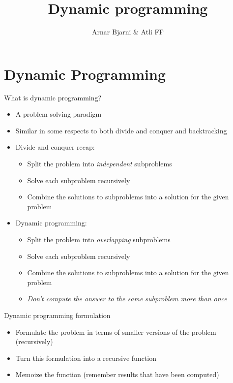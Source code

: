 \documentclass{beamer}
\title{Dynamic programming}
\author{Arnar Bjarni \& Atli FF}
\institute{\href{http://ru.is/td}{School of Computer Science} \\[2pt] \href{http://ru.is}{Reykjavík University}}
\begin{document}
\maketitle

\section*{Dynamic Programming}

\begin{frame}[plain]{What is dynamic programming?}
    \begin{itemize}
        \item A problem solving paradigm
        \item Similar in some respects to both divide and conquer and backtracking
        \vspace{5pt}
        \item Divide and conquer recap:
        \begin{itemize}
            \item Split the problem into \textit{independent} subproblems
            \item Solve each subproblem recursively
            \item Combine the solutions to subproblems into a solution for the given problem
        \end{itemize}
        \vspace{5pt}
        \item Dynamic programming:
        \begin{itemize}
            \item Split the problem into \textit{overlapping} subproblems
            \item Solve each subproblem recursively
            \item Combine the solutions to subproblems into a solution for the given problem
            \item \textit{Don't compute the answer to the same subproblem more than once}
        \end{itemize}
    \end{itemize}
\end{frame}

\begin{frame}{Dynamic programming formulation}
    \vspace{30pt}
    \begin{itemize}
        \item Formulate the problem in terms of smaller versions of the problem (recursively)
        \item Turn this formulation into a recursive function
        \item Memoize the function (remember results that have been computed)
    \end{itemize}
\end{frame}
\end{document}
